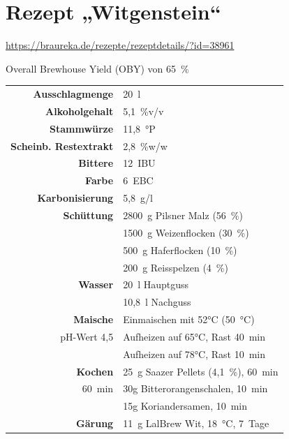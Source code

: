 \documentclass[a4paper,parskip=half]{scrartcl}
\begin{document}
\section*{Rezept „Witgenstein“}

\url{https://braureka.de/rezepte/rezeptdetails/?id=38961}

Overall Brewhouse Yield (OBY) von 65~\%


\begin{table}[H]
\centering
\begin{tabular}{rl}
\toprule
\textbf{Ausschlagmenge} & 20~l \\
\textbf{Alkoholgehalt} & 5,1~\%v/v \\
\textbf{Stammwürze} & 11,8~°P \\
\textbf{Scheinb. Restextrakt} & 2,8~\%w/w \\
\textbf{Bittere} & 12~IBU \\
\textbf{Farbe} & 6~EBC \\
\textbf{Karbonisierung} & 5,8~g/l \\
\midrule
\textbf{Schüttung} & 2800~g Pilsner Malz (56~\%) \\
 & 1500~g Weizenflocken (30~\%) \\
 & 500~g Haferflocken (10~\%) \\ 
 & 200~g Reisspelzen (4~\%) \\
\midrule
\textbf{Wasser} & 20~l Hauptguss \\
 & 10,8~l Nachguss \\
\midrule
\textbf{Maische} & Einmaischen mit 52°C (50~°C) \\
pH-Wert 4,5 & Aufheizen auf 65°C, Rast 40~min \\
 & Aufheizen auf 78°C, Rast 10~min \\
\midrule
\textbf{Kochen} & 25~g Saazer Pellets (4,1~\%), 60~min \\
60~min & 30g Bitterorangenschalen, 10~min \\
 & 15g Koriandersamen, 10~min \\
\midrule
\textbf{Gärung} & 11~g LalBrew Wit, 18~°C, 7~Tage \\
\bottomrule
\end{tabular}
\end{table}

\printbibliography[title=Quellen]
\end{document}
